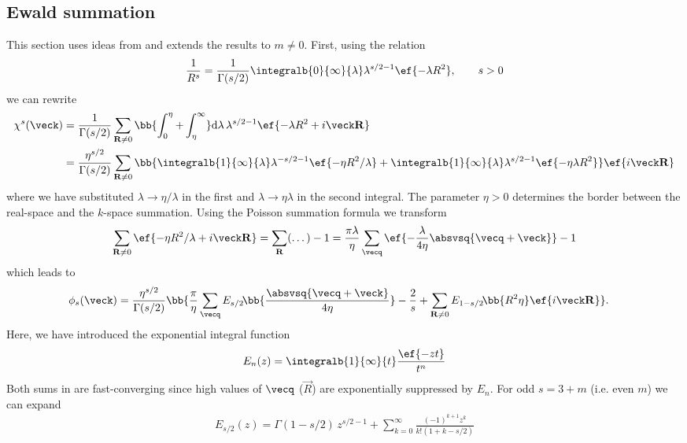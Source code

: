 \subsection{Ewald summation}
This section uses ideas from  and extends the results to $m\ne 0$.
First, using the relation
\begin{align}
    \frac{1}{R^s}=\frac{1}{\Gamma(s/2)} \integralb{0}{\infty}{\lambda} \lambda^{s/2-1} \ef{-\lambda R^2},\qquad s>0
\end{align}
we can rewrite
\begin{align}
    \chi^s(\veck)&=\frac{1}{\Gamma(s/2)}\sum_{\vec{R}\ne 0} \bb{\int_0^\eta + \int_\eta^\infty} \mathrm{d}\lambda\, \lambda^{s/2-1} \ef{-\lambda R^2 + i \veck \vec{R}} \\
                 &= \frac{\eta^{s/2}}{\Gamma(s/2)}\sum_{\vec{R}\ne 0} \bb{\integralb{1}{\infty}{\lambda} \lambda^{-s/2-1} \ef{-\eta R^2 / \lambda} + \integralb{1}{\infty}{\lambda} \lambda^{s/2-1} \ef{-\eta \lambda R^2}} \ef{i\veck \vec{R}}
\end{align}
where we have substituted $\lambda \rightarrow \eta/\lambda$ in the first and $\lambda \rightarrow \eta \lambda$ in the second integral.
The parameter $\eta > 0$ determines the border between the real-space and the $k$-space summation.
Using the Poisson summation formula we transform
\begin{align}
    \sum_{\vec{R}\ne 0} \ef{-\eta R^2/\lambda + i \veck \vec{R}} = \sum_{\vec{R}} (\dots) - 1 = \frac{\pi\lambda}{\eta} \sum_{\vecq} \ef{-\frac{\lambda}{4\eta} \absvsq{\vecq+\veck}} - 1
\end{align}
which leads to
\begin{align} \tlabel{twosum}
    \phi_s(\veck) &= \frac{\eta^{s/2}}{\Gamma(s/2)} \bb{\frac{\pi}{\eta} \sum_{\vecq} E_{s/2}\!\bb{\frac{\absvsq{\vecq+\veck}}{4\eta}} - \frac{2}{s} + \sum_{\vec{R}\ne 0} E_{1-s/2}\!\bb{R^2 \eta} \ef{i \veck \vec{R}} }.
\end{align}
Here, we have introduced the exponential integral function
\begin{align}
    E_n(z) = \integralb{1}{\infty}{t} \frac{\ef{-z t}}{t^n}
\end{align}
Both sums in  are fast-converging since high
values of $\vecq$ ($\vec{R}$) are exponentially suppressed by $E_n$.
For odd $s=3+m$ (i.e. even $m$) we can expand
\begin{align}
    E_{s/2}(z) = \Gamma(1-s/2)\, z^{s/2-1} + \sum_{k=0}^\infty \frac{(-1)^{k+1} z^k}{k! (1+k-s/2)}
\end{align}
